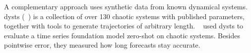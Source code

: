A complementary approach uses synthetic data from known dynamical systems. dysts (\citeauthor{dysts}~\cite{dysts}) is a collection of over 130 chaotic systems with published parameters, together with tools to generate trajectories of arbitrary length. \citeauthor{zhang2025chaos}~\cite{zhang2025chaos} used dysts to evaluate a time series foundation model zero-shot on chaotic systems. Besides pointwise error, they measured how long forecasts stay accurate.


